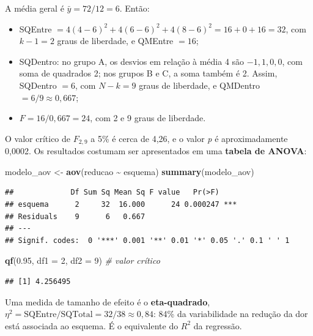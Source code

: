 \documentclass[
]{book}
\newenvironment{Shaded}{\begin{snugshade}}{\end{snugshade}}
\newcommand{\AttributeTok}[1]{\textcolor[rgb]{0.13,0.29,0.53}{#1}}
\newcommand{\CommentTok}[1]{\textcolor[rgb]{0.56,0.35,0.01}{\textit{#1}}}
\newcommand{\DecValTok}[1]{\textcolor[rgb]{0.00,0.00,0.81}{#1}}
\newcommand{\FloatTok}[1]{\textcolor[rgb]{0.00,0.00,0.81}{#1}}
\newcommand{\FunctionTok}[1]{\textcolor[rgb]{0.13,0.29,0.53}{\textbf{#1}}}
\newcommand{\NormalTok}[1]{#1}
\newcommand{\OtherTok}[1]{\textcolor[rgb]{0.56,0.35,0.01}{#1}}
\newcommand{\SpecialCharTok}[1]{\textcolor[rgb]{0.81,0.36,0.00}{\textbf{#1}}}
\providecommand{\tightlist}{%
  \setlength{\itemsep}{0pt}\setlength{\parskip}{0pt}}
\begin{document}
A média geral é \(\bar{y} = 72/12 = 6\). Então:

\begin{itemize}
\tightlist
\item
  SQEntre \(= 4(4 - 6)^2 + 4(6 - 6)^2 + 4(8 - 6)^2 = 16 + 0 + 16 = 32\), com \(k - 1 = 2\) graus de liberdade, e QMEntre \(= 16\);
\item
  SQDentro: no grupo A, os desvios em relação à média 4 são \(-1, 1, 0, 0\), com soma de quadrados 2; nos grupos B e C, a soma também é 2. Assim, SQDentro \(= 6\), com \(N - k = 9\) graus de liberdade, e QMDentro \(= 6/9 \approx 0{,}667\);
\item
  \(F = 16/0{,}667 = 24\), com 2 e 9 graus de liberdade.
\end{itemize}

O valor crítico de \(F_{2,9}\) a 5\% é cerca de 4,26, e o valor \emph{p} é aproximadamente 0,0002. Os resultados costumam ser apresentados em uma \textbf{tabela de ANOVA}:

\begin{Shaded}
\begin{Highlighting}[]
\NormalTok{modelo\_aov }\OtherTok{\textless{}{-}} \FunctionTok{aov}\NormalTok{(reducao }\SpecialCharTok{\textasciitilde{}}\NormalTok{ esquema)}
\FunctionTok{summary}\NormalTok{(modelo\_aov)}
\end{Highlighting}
\end{Shaded}

\begin{verbatim}
##             Df Sum Sq Mean Sq F value   Pr(>F)    
## esquema      2     32  16.000      24 0.000247 ***
## Residuals    9      6   0.667                     
## ---
## Signif. codes:  0 '***' 0.001 '**' 0.01 '*' 0.05 '.' 0.1 ' ' 1
\end{verbatim}

\begin{Shaded}
\begin{Highlighting}[]
\FunctionTok{qf}\NormalTok{(}\FloatTok{0.95}\NormalTok{, }\AttributeTok{df1 =} \DecValTok{2}\NormalTok{, }\AttributeTok{df2 =} \DecValTok{9}\NormalTok{)   }\CommentTok{\# valor crítico}
\end{Highlighting}
\end{Shaded}

\begin{verbatim}
## [1] 4.256495
\end{verbatim}

Uma medida de tamanho de efeito é o \textbf{eta-quadrado}, \(\eta^2 = \text{SQEntre}/\text{SQTotal} = 32/38 \approx 0{,}84\): 84\% da variabilidade na redução da dor está associada ao esquema. É o equivalente do \(R^2\) da regressão.
\end{document}
